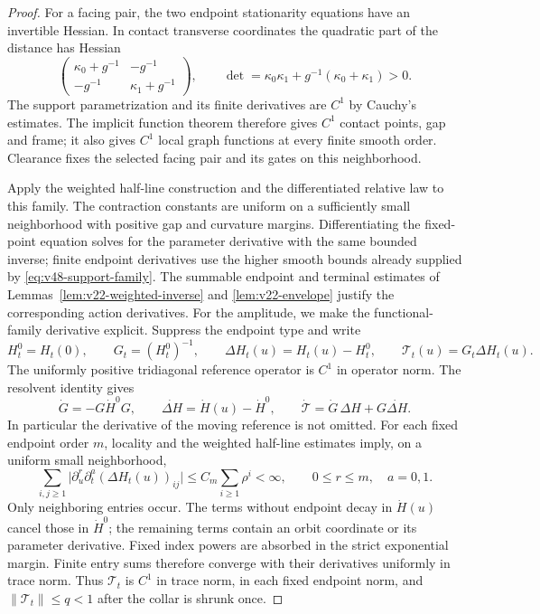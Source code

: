 \begin{proof}
For a facing pair, the two endpoint stationarity equations have an
invertible Hessian.  In contact transverse coordinates the quadratic
part of the distance has Hessian
\[
 \begin{pmatrix}\kappa_0+g^{-1}&-g^{-1}\\
                 -g^{-1}&\kappa_1+g^{-1}\end{pmatrix},
 \qquad
 \det=\kappa_0\kappa_1+g^{-1}(\kappa_0+\kappa_1)>0.
\]
The support parametrization and its finite derivatives are $C^1$ by
Cauchy's estimates.  The implicit function theorem therefore gives
$C^1$ contact points, gap and frame; it also gives $C^1$ local graph
functions at every finite smooth order.  Clearance fixes the selected
facing pair and its gates on this neighborhood.

Apply the weighted half-line construction and the differentiated
relative law to this family.  The contraction constants are uniform
on a sufficiently small neighborhood with positive gap and curvature
margins.  Differentiating the fixed-point equation solves for the
parameter derivative with the same bounded inverse; finite endpoint
derivatives use the higher smooth bounds already supplied by
\eqref{eq:v48-support-family}.  The summable endpoint and terminal
estimates of Lemmas~\ref{lem:v22-weighted-inverse} and
\ref{lem:v22-envelope} justify the corresponding action derivatives.
For the amplitude, we make the functional-family derivative explicit.
Suppress the endpoint type and write
\[
 H_t^0=H_t(0),\qquad G_t=(H_t^0)^{-1},\qquad
 \Delta H_t(u)=H_t(u)-H_t^0,\qquad
 \mathcal T_t(u)=G_t\Delta H_t(u).
\]
The uniformly positive tridiagonal reference operator is $C^1$ in
operator norm.  The resolvent identity gives
\begin{equation}\label{eq:v49-moving-reference}
 \dot G=-G\dot H^0G,\qquad
 \dot{\Delta H}=\dot H(u)-\dot H^0,\qquad
 \dot{\mathcal T}=\dot G\,\Delta H+G\dot{\Delta H}.
\end{equation}
In particular the derivative of the moving reference is not omitted.
For each fixed endpoint order $m$, locality and the weighted half-line
estimates imply, on a uniform small neighborhood,
\[
 \sum_{i,j\ge1}\bigl|
       \partial_u^r\partial_t^a(\Delta H_t(u))_{ij}\bigr|
       \le C_m\sum_{i\ge1}\rho^i<\infty,
          \qquad 0\le r\le m,\quad a=0,1.
\]
Only neighboring entries occur.  The terms without endpoint decay in
$\dot H(u)$ cancel those in $\dot H^0$; the remaining terms contain
an orbit coordinate or its parameter derivative.  Fixed index powers
are absorbed in the strict exponential margin.  Finite entry sums
therefore converge with their derivatives uniformly in trace norm.
Thus $\mathcal T_t$ is $C^1$ in trace norm, in each fixed endpoint norm,
and $\|\mathcal T_t\|\le q<1$ after the collar is shrunk once.


\end{proof}
